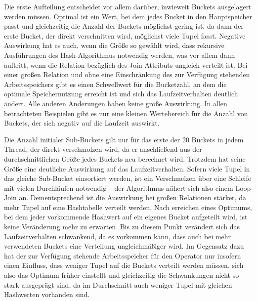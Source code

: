 \documentclass[a4paper,12pt,twoside]{article}
\begin{document}
Die erste Aufteilung entscheidet vor allem darüber, inwieweit Buckets ausgelagert werden müssen. Optimal ist ein Wert, bei dem jedes Bucket in den Hauptspeicher passt und gleichzeitig die Anzahl der Buckets möglichst gering ist, da dann der erste Bucket, der direkt verschnitten wird, möglichst viele Tupel fasst. Negative Auswirkung hat es auch, wenn die Größe so gewählt wird, dass rekursive Ausführungen des Hash-Algorithmus notwendig werden, was vor allem dann auftritt, wenn die Relation bezüglich des Join-Attributs ungleich verteilt ist. Bei einer großen Relation und ohne eine Einschränkung des zur Verfügung stehenden Arbeitsspeichers gibt es einen Schwellwert für die Bucketzahl, an dem die optimale Speichernutzung erreicht ist und sich das Laufzeitverhalten deutlich ändert. Alle anderen Änderungen haben keine große Auswirkung. In allen betrachteten Beispielen gibt es nur eine kleinen Wertebereich für die Anzahl von Buckets, der sich negativ auf die Laufzeit auswirkt.

Die Anzahl initialer Sub-Buckets gilt nur für das erste der 20 Buckets in jedem Thread, der direkt verschmolzen wird, da er anschließend aus der durchschnittlichen Größe jedes Buckets neu berechnet wird. Trotzdem hat seine Größe eine deutliche Auswirkung auf das Laufzeitverhalten. Sofern viele Tupel in das gleiche Sub-Bucket einsortiert werden, ist ein Verschmelzen über eine Schleife mit vielen Durchläufen notwendig -- der Algorithmus nähert sich also einem Loop-Join an. Dementsprechend ist die Auswirkung bei großen Relationen stärker, da mehr Tupel auf eine Hashtabelle verteilt werden. Nach erreichen eines Optimums, bei dem jeder vorkommende Hashwert auf ein eigenes Bucket aufgeteilt wird, ist keine Veränderung mehr zu erwarten. Bis zu diesem Punkt verändert sich das Laufzeitverhalten schwankend, da es vorkommen kann, dass auch bei mehr verwendeten Buckets eine Verteilung ungleichmäßiger wird. Im Gegensatz dazu hat der zur Verfügung stehende Arbeitsspeicher für den Operator nur insofern einen Einfluss, dass weniger Tupel auf die Buckets verteilt werden müssen, sich also das Optimum früher einstellt und gleichzeitig die Schwankungen nicht so stark ausgeprägt sind, da im Durchschnitt auch weniger Tupel mit gleichen Hashwerten vorhanden sind.
\end{document}
